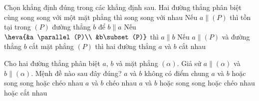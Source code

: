 \begin{ex}%
	Chọn khẳng định  đúng trong các khẳng định sau.
	\choice 
		{Hai đường thẳng phân biệt cùng  song song với một mặt phẳng thì song song với nhau}
		{\True Nếu $a \parallel (P)$ thì tồn  tại trong $(P)$ đường thẳng $b$ để $b \parallel a$}
		{Nếu $\heva{&a \parallel  (P)\\
		 &b\subset (P)}$ thì $a\parallel b$}
		{Nếu $a \parallel (P)$ và đường thẳng $b$ cắt  mặt phẳng $(P)$ thì hai đường thẳng $a$ và $b$ cắt nhau}
	 \loigiai{
	} 
\end{ex}

\begin{ex}%
	Cho hai đường thẳng phân biệt $a$, $b$ và mặt phẳng $\left(\alpha \right)$. Giả sử $a\parallel \left(\alpha \right)$  và $b\parallel \left(\alpha \right)$. Mệnh đề nào sau đây đúng?
	 \choice
		{$a$  và $b$ không có điểm chung}
		{$a$ và  $b$ hoặc song song hoặc chéo nhau}
		 {$a$ và $b$ chéo nhau}
		{\True $a$ và $b$ hoặc song song hoặc  chéo nhau hoặc cắt nhau}
\end{ex}

